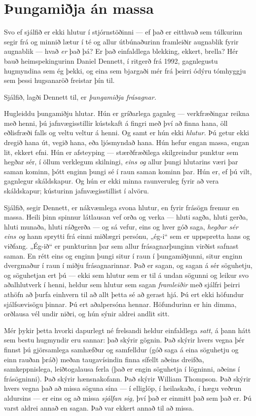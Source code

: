 \section*{Þungamiðja án massa}

Svo ef sjálfið er ekki hlutur í stjórnstöðinni — ef það er eitthvað sem túlkurinn segir frá og minnið lætur í té og allur útbúnaðurinn framleiðir augnablik fyrir augnablik — hvað \emph{er} það þá? Er það einfaldlega blekking, ekkert, brella? Hér bauð heimspekingurinn Daniel Dennett, í ritgerð frá 1992, gagnlegustu hugmyndina sem ég þekki, og eina sem bjargaði mér frá þeirri ódýru tómhyggju sem þessi hugsanaröð freistar þín til.

Sjálfið, lagði Dennett til, er \emph{þungamiðja frásagnar.}

Hugleiddu þungamiðju hlutar. Hún er gríðarlega gagnleg — verkfræðingar reikna með henni, þú jafnvægisstillir kústskaft á fingri með því að finna hana, öll eðlisfræði falls og veltu veltur á henni. Og samt er hún ekki \emph{hlutur.} Þú getur ekki dregið hana út, vegið hana, eða ljósmyndað hana. Hún hefur engan massa, engan lit, ekkert efni. Hún er afsteyping — stærðfræðilega skilgreindur punktur sem hegðar sér, í öllum verklegum skilningi, \emph{eins og} allur þungi hlutarins væri þar saman kominn, þótt enginn þungi sé í raun saman kominn þar. Hún er, ef þú vilt, gagnlegur skáldskapur. Og hún er ekki minna raunveruleg fyrir að vera skáldskapur; kústurinn jafnvægisstillist í alvöru.

Sjálfið, segir Dennett, er nákvæmlega svona hlutur, en fyrir frásögn fremur en massa. Heili þinn spinnur látlausan vef orða og verka — hluti sagða, hluti gerða, hluti munaða, hluti ráðgerða — og sá vefur, eins og hver góð saga, \emph{hegðar sér eins og} hann sprytti frá einni miðlægri persónu, „ég-i“ sem er uppspretta hans og viðfang. „Ég-ið“ er punkturinn þar sem allur frásagnarþunginn virðist safnast saman. En rétt eins og enginn þungi situr í raun í þungamiðjunni, situr enginn dvergmaður í raun í miðju frásagnarinnar. Það er sagan, og sagan á sér söguhetju, og söguhetjan ert þú — ekki sem hlutur sem er til á undan sögunni og leikur svo aðalhlutverk í henni, heldur sem hlutur sem sagan \emph{framleiðir} með sjálfri þeirri athöfn að þurfa einhvern til að allt þetta sé að gerast hjá. Þú ert ekki höfundur sjálfsævisögu þinnar. Þú ert aðalpersóna hennar. Höfundurinn er hin dimma, orðlausa vél undir niðri, og hún sýnir aldrei andlit sitt.

Mér þykir þetta hvorki dapurlegt né frelsandi heldur einfaldlega \emph{satt,} á þann hátt sem bestu hugmyndir eru sannar: það skýrir gögnin. Það skýrir hvers vegna þér finnst þú gjörsamlega samhæfður og samfelldur (góð saga á eina söguhetju og einn rauðan þráð) meðan taugavísindin finna sífellt aðeins dreifða, samkeppnislega, leiðtogalausa ferla (það er engin söguhetja í lögninni, aðeins í frásögninni). Það skýrir hænsnakofann. Það skýrir William Thompson. Það skýrir hvers vegna það að missa söguna sína — í elliglöp, í heilaskaða, í hægu veðrun aldursins — er eins og að missa \emph{sjálfan sig,} því það er einmitt það sem það er. Þú varst aldrei annað en sagan. Það var ekkert annað til að missa.


